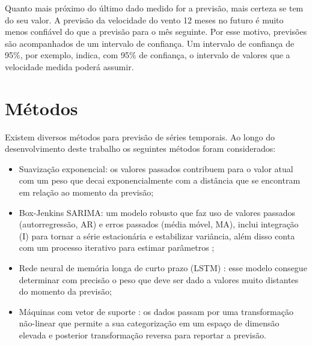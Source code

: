 \documentclass[
	12pt,				%
	openright,			%
	oneside,			%
	a4paper,			%
	english,			%
	french,				%
	spanish,			%
	brazil				%
	]{abntex2}
\begin{document}
Quanto mais próximo do último dado medido for a previsão, mais certeza se tem do seu valor. A previsão da velocidade do vento 12 meses no futuro é muito menos confiável do que a previsão para o mês seguinte. Por esse motivo, previsões são acompanhados de um intervalo de confiança. Um intervalo de confiança de 95\%, por exemplo, indica, com 95\% de confiança, o intervalo de valores que a velocidade medida poderá assumir.


\section{Métodos}

Existem diversos métodos para previsão de séries temporais. Ao longo do desenvolvimento deste trabalho os seguintes métodos foram considerados: 
\begin{itemize}
\item Suavização exponencial: os valores passados contribuem para o valor atual com um peso que decai exponencialmente com a distância que se encontram em relação ao momento da previsão;
\item Box-Jenkins SARIMA: um modelo robusto que faz uso de valores passados (autorregressão, AR) e erros passados (média móvel, MA), inclui integração (I) para tornar a série estacionária e estabilizar variância, além disso conta com um processo iterativo para estimar parâmetros \cite{boxjay};
\item Rede neural de memória longa de curto prazo (LSTM) \cite{llstm}: esse modelo consegue determinar com precisão o peso que deve ser dado a valores muito distantes do momento da previsão;
\item Máquinas com vetor de suporte \cite{ssvm}: os dados passam por uma transformação não-linear que permite a sua categorização em um espaço de dimensão elevada e posterior transformação reversa para reportar a previsão.
\end{itemize}
\end{document}
